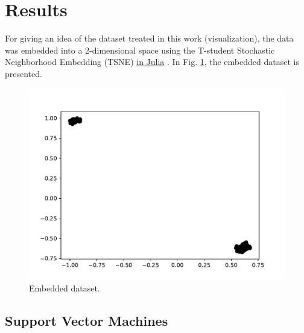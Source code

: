 \documentclass[conference]{IEEEtran}
\theoremstyle{definition}
\theoremstyle{remark}
\theoremstyle{remark}
\begin{document}
\section{Results}\label{sec:res}
For giving an idea of the dataset treated in this work (visualization), the data
was embedded into a 2-dimensional space using the T-student Stochastic
Neighborhood Embedding (TSNE) \href{https://github.com/lejon/TSne.jl}{in Julia}
\parencite{maaten2008}. In Fig. \ref{fig:emb_dat}, the embedded dataset is
presented.
\begin{figure}
  \includegraphics[width=\columnwidth]{figs/embedded-data.pdf}
  \caption{Embedded dataset.}
  \label{fig:emb_dat}
\end{figure}

\subsection{Support Vector Machines}
\end{document}
